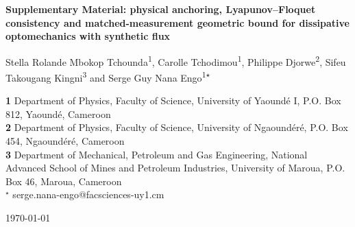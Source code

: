 \documentclass[Phys]{SciPost}
\begin{document}
\begin{center}{\Large \textbf{
Supplementary Material: physical anchoring, Lyapunov--Floquet consistency and matched-measurement geometric bound for dissipative optomechanics with synthetic flux\\
}}\end{center}

\begin{center}
Stella Rolande Mbokop Tchounda\textsuperscript{1},
Carolle Tchodimou\textsuperscript{1},
Philippe Djorwe\textsuperscript{2},
Sifeu Takougang Kingni\textsuperscript{3} and
Serge Guy Nana Engo\textsuperscript{1$\star$}
\end{center}

\begin{center}
{\bf 1} Department of Physics, Faculty of Science, University of Yaound\'e I, P.O. Box 812, Yaound\'e, Cameroon
\\
{\bf 2} Department of Physics, Faculty of Science, University of Ngaound\'er\'e, P.O. Box 454, Ngaound\'er\'e, Cameroon
\\
{\bf 3} Department of Mechanical, Petroleum and Gas Engineering, National Advanced School of Mines and Petroleum Industries, University of Maroua, P.O. Box 46, Maroua, Cameroon
\\
${}^\star$ {\small \sf serge.nana-engo@facsciences-uy1.cm}
\end{center}

\begin{center}
\today
\end{center}
\end{document}
